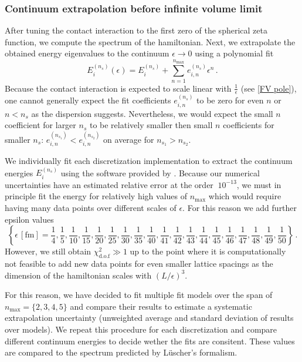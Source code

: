 \subsubsection{Continuum extrapolation before infinite volume limit}

After tuning the contact interaction to the first zero of the spherical zeta function, we compute the spectrum of the hamiltonian.
Next, we extrapolate the obtained energy eigenvalues to the continuum $\epsilon \to 0$ using a polynomial fit
\begin{equation}
    E^{(n_s)}_i(\epsilon) = E_i^{(n_s)} + \sum\limits_{n=1}^{n_\mathrm{max}} e_{i,n}^{(n_s)} \epsilon^n \, .
\end{equation}
Because the contact interaction is expected to scale linear with $\frac{1}{\epsilon}$ (see \eqref{FV pole}), one cannot generally expect the fit coefficients $e_{i,n}^{(n_s)}$ to be zero for even $n$ or $n < n_s$ as the dispersion suggests.
Nevertheless, we would expect the small $n$ coefficient for larger $n_s$ to be relatively smaller then small $n$ coefficients for smaller $n_s$: $e_{i,n}^{(n_{s_1})} < e_{i,n}^{(n_{s_2})}$ on average for $n_{s_1} > n_{s_2}$.

We individually fit each discretization implementation to extract the continuum energies $E_i^{(n_s)}$ using the software provided by \cite{peter_lepage_2016_60221}.
Because our numerical uncertainties have an estimated relative error at the order $~10^{-13}$, we must in principle fit the energy for relatively high values of $n_\mathrm{max}$ which would require having many data points over different scales of $\epsilon$.
For this reason we add further epsilon values
\begin{equation}
	\left\{
		\epsilon \, [\mathrm{fm}] =
		\frac{1}{4}, \frac{1}{5}, \frac{1}{10},
		\frac{1}{15}, \frac{1}{20}, \frac{1}{25},
		\frac{1}{ 30}, \frac{1}{ 35}, \frac{1}{ 40},
		\frac{1}{ 41}, \frac{1}{ 42}, \frac{1}{ 43},
		\frac{1}{ 44}, \frac{1}{45}, \frac{1}{ 46},
		\frac{1}{ 47}, \frac{1}{ 48}, \frac{1}{ 49}, \frac{1}{ 50}
	\right\}
	\, .
\end{equation}
However, we still obtain $\chi^2_{\mathrm{d.o.f}} \gg 1$ up to the point where it is computationally not feasible to add new data points for even smaller lattice spacings as the dimension of the hamiltonian scales with $(L/\epsilon)^3$.

For this reason, we have decided to fit multiple fit models over the span of $n_\mathrm{max} = \{2, 3, 4, 5\}$ and compare their results to estimate a systematic extrapolation uncertainty (unweighted average and standard deviation of results over models).
We repeat this procedure for each discretization and compare different continuum energies to decide wether the fits are consitent.
These values are compared to the spectrum predicted by Lüscher's formalism.

